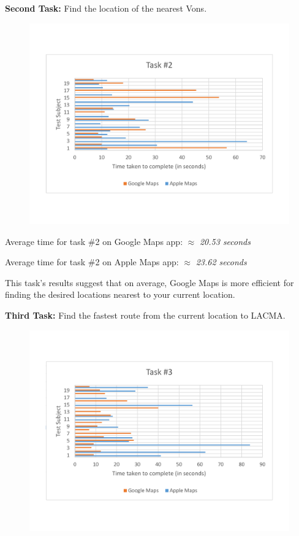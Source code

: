 \documentclass[a4paper; 11pt]{article}
\begin{document}
\clearpage
\par
\noindent
\textbf{Second Task: }Find the location of the nearest Vons.
\begin{figure}[htbp]
\begin{center}
\vspace{-.4in}
\includegraphics[keepaspectratio, width=.8\textwidth ]{task2.pdf}
\end{center}
\end{figure}
\begin{center}
\vspace{-.6in}
\par
Average time for task \#2 on Google Maps app: $ \approx $ \textit{20.53 seconds}
\par
Average time for task \#2 on Apple Maps app: $ \approx $ \textit{23.62 seconds}
\end{center}
\par
\noindent
This task's results suggest that on average, Google Maps is more efficient for finding the desired locations nearest to your current location. 
\par
\medskip
\noindent
\textbf{Third Task: }Find the fastest route from the current location to LACMA.
\begin{figure}[htbp]
\begin{center}
\vspace{-.4in}
\includegraphics[keepaspectratio, width=.8\textwidth ]{task3.pdf}
\end{center}
\end{figure}
\end{document}
